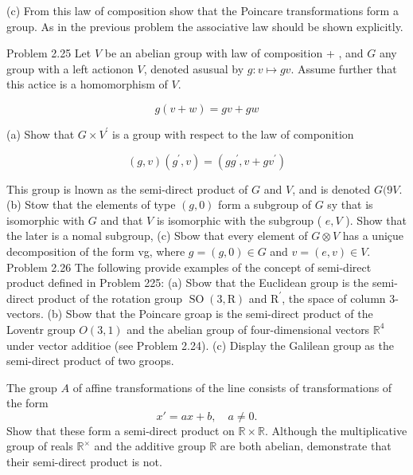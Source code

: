 (c) From this law of composition show that the Poincare transformations form a group. As in the previous problem the associative law should be shown explicitly.

Problem 2.25 Let $V$ be an abelian group with law of composition + , and $G$ any group with a left actionon $V$, denoted asusual by $g: v \mapsto g v$. Assume further that this actice is a homomorphism of $V$.

$$
g(v+w)=g v+g w
$$

(a) Show that $G \times V^{\prime}$ is a group with respect to the law of componition

$$
(g, v)\left(g^{\prime}, v\right)=\left(g g^{\prime}, v+g v^{\prime}\right)
$$


This group is lnown as the semi-direct product of $G$ and $V$, and is denoted $G(9 V$.
(b) Stow that the elements of type $(g, 0)$ form a subgroup of $G$ sy that is isomorphic with $G$ and that $V$ is isomorphic with the subgroup ( $e, V$ ). Show that the later is a nomal subgroup,
(c) Sbow that every element of $G \otimes V$ has a uniçue decomposition of the form vg, where $g=(g, 0) \in G$ and $v=(e, v) \in V$.
Problem 2.26 The following provide examples of the concept of semi-direct product defined in Problem 225:
(a) Sbow that the Euclidean group is the semi-direct product of the rotation group $\operatorname{SO}(3, \mathrm{R})$ and $\mathrm{R}^{\prime}$, the space of column 3-vectors.
(b) Sbow that the Poincare groap is the semi-direct product of the Loventr group $O(3,1)$ and the abelian group of four-dimensional vectors $\mathbb{R}^4$ under vector additioe (see Problem 2.24).
(c) Display the Galilean group as the semi-direct product of two groops.

\begin{problem}\label{pro:2.27}
    The group \(A\) of affine transformations of the line consists of transformations of the form
\[
x' = ax + b, \quad a \neq 0.
\]
Show that these form a semi-direct product on \(\mathbb{R} \times \mathbb{R}\). Although the multiplicative group of reals \(\mathbb{R}^\times\) and the additive group \(\mathbb{R}\) are both abelian, demonstrate that their semi-direct product is not.

\end{problem}

